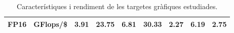 \begin{table}[h]
\begin{adjustwidth}{-1.0in}{-1.0in}
\begin{center}
{\begin{tabular}{cc||c|c|c|c|c|c|c}
\multirow{-3}{*}{FP16}            & GFlops/\$                                                                              & 3.91                                                            & 23.75                                                            & 6.81                                                                 & 30.33                                                         & 2.27                                                                 & 6.19                                                                   & 2.75 \\ \hline
\end{tabular}
    }
\end{center}
\end{adjustwidth}
    \caption{Característiques i rendiment de les targetes gràfiques estudiades.}
    \label{tab:gpu_specs}
\end{table}
